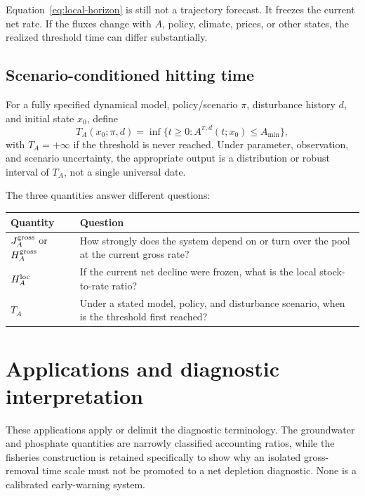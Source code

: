 \documentclass[11pt]{article}
\begin{document}
Equation~\eqref{eq:local-horizon} is still not a trajectory forecast. It freezes the current net rate. If the fluxes change with $A$, policy, climate, prices, or other states, the realized threshold time can differ substantially.

\subsection{Scenario-conditioned hitting time}

For a fully specified dynamical model, policy/scenario $\pi$, disturbance history $d$, and initial state $x_0$, define
\begin{equation}
T_A(x_0;\pi,d)
=\inf\{t\ge0:A^{\pi,d}(t;x_0)\le A_{\min}\},
\label{eq:hitting-time}
\end{equation}
with $T_A=+\infty$ if the threshold is never reached. Under parameter, observation, and scenario uncertainty, the appropriate output is a distribution or robust interval of $T_A$, not a single universal date.

The three quantities answer different questions:

\begin{center}
\begin{tabularx}{\textwidth}{lX}
\toprule
Quantity & Question\\
\midrule
$J_A^{\rm gross}$ or $H_A^{\rm gross}$ & How strongly does the system depend on or turn over the pool at the current gross rate?\\
$H_A^{\rm loc}$ & If the current net decline were frozen, what is the local stock-to-rate ratio?\\
$T_A$ & Under a stated model, policy, and disturbance scenario, when is the threshold first reached?\\
\bottomrule
\end{tabularx}
\end{center}

\section{Applications and diagnostic interpretation}

These applications apply or delimit the diagnostic terminology. The groundwater and phosphate quantities are narrowly classified accounting ratios, while the fisheries construction is retained specifically to show why an isolated gross-removal time scale must not be promoted to a net depletion diagnostic. None is a calibrated early-warning system.
\end{document}
